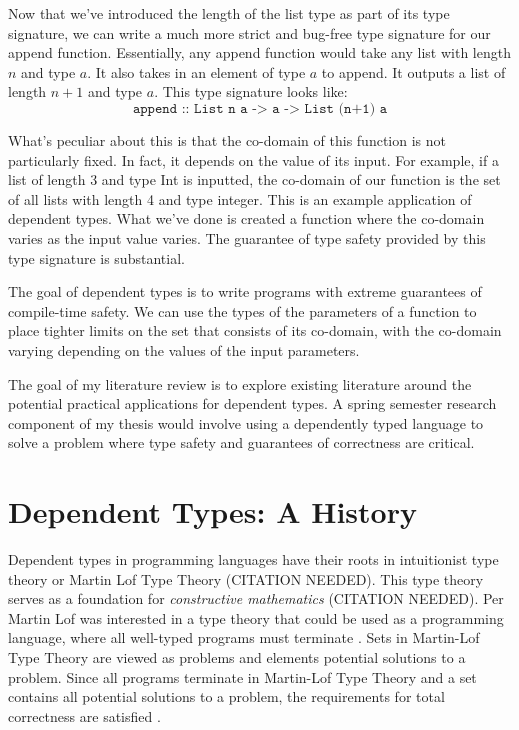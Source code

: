 Now that we've introduced the length of the list type as part of its type
signature, we can write a much more strict and bug-free type signature for our
append function. Essentially, any append function would take any list with
length $n$ and type $a$. It also takes in an element of type $a$ to append. It
outputs a list of length $n+1$ and type $a$. This type signature looks like: $$
\texttt{append :: List n a -> a -> List (n+1) a} $$

What's peculiar about this is that the co-domain of this function is not
particularly fixed. In fact, it depends on the value of its input. For example,
if a list of length 3 and type Int is inputted, the co-domain of our function is
the set of all lists with length 4 and type integer. This is an example
application of dependent types. What we've done is created a function where the
co-domain varies as the input value varies. The guarantee of type safety
provided by this type signature is substantial. 

The goal of dependent types is to write programs with extreme guarantees of
compile-time safety. We can use the types of the parameters of a function to
place tighter limits on the set that consists of its co-domain, with the
co-domain varying depending on the values of the input parameters. 

The goal of my literature review is to explore existing literature around the
potential practical applications for dependent types. A spring semester research
component of my thesis would involve using a dependently typed language to solve
a problem where type safety and guarantees of correctness are critical. 

\section{Dependent Types: A History}
Dependent types in programming languages have their roots in intuitionist type
theory or Martin Lof Type Theory (CITATION NEEDED). This type theory serves as a
foundation for \textit{constructive mathematics} (CITATION NEEDED). Per Martin
Lof was interested in a type theory that could be used as a programming
language, where all well-typed programs must terminate \cite{intro_martin_lof}.
Sets in Martin-Lof Type Theory are viewed as problems and elements potential
solutions to a problem. Since all programs terminate in Martin-Lof Type Theory
and a set contains all potential solutions to a problem, the requirements for
total correctness are satisfied \cite{intro_martin_lof}.

